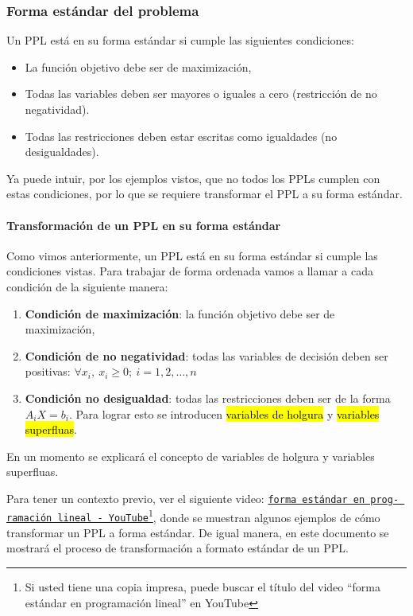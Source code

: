 \subsubsection{Forma estándar del problema}
\label{sec:forma_estandar}

Un PPL está en su forma estándar si cumple las siguientes condiciones:
\begin{itemize}
  \item La función objetivo debe ser de maximización,
  \item Todas las variables deben ser mayores o iguales a cero (restricción de no negatividad).
  \item Todas las restricciones deben estar escritas como igualdades (no desigualdades).
\end{itemize}
Ya puede intuir, por los ejemplos vistos, que no todos los PPLs cumplen con estas condiciones, por lo que se requiere transformar el PPL a su forma estándar.

\paragraph{Transformación de un PPL en su forma estándar}

Como vimos anteriormente, un PPL está en su forma estándar si cumple las condiciones vistas. Para trabajar de forma ordenada vamos a llamar a cada condición de la siguiente manera:
\begin{enumerate}
  \item \textbf{Condición de maximización}: la función objetivo debe ser de maximización,
  \item \textbf{Condición de no negatividad}: todas las variables de decisión deben ser positivas: \(\forall x_i,\ x_i \geq 0;\ i = 1,2,\ldots,n\)
  \item \textbf{Condición no desigualdad}: todas las restricciones deben ser de la forma \(A_iX = b_i\). Para lograr esto se introducen \hl{variables de holgura} y \hl{variables superfluas}.
\end{enumerate}
En un momento se explicará el concepto de variables de holgura y variables superfluas.

Para tener un contexto previo, ver el siguiente video: \href{https://www.youtube.com/watch?v=6f5K3O7yUzU}{\texttt{forma estándar en prog- ramación lineal - YouTube}}\footnote{Si usted tiene una copia impresa, puede buscar el título del video ``forma estándar en programación lineal'' en YouTube}, donde se muestran algunos ejemplos de cómo transformar un PPL a forma estándar. De igual manera, en este documento se mostrará el proceso de transformación a formato estándar de un PPL. 

